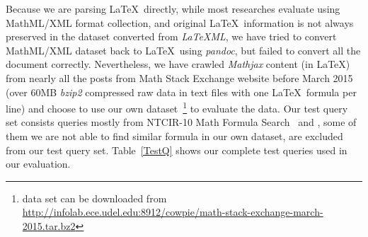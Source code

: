 Because we are parsing \LaTeX\ directly, while most researches evaluate using MathML/XML format collection, 
and original \LaTeX\ information is not always preserved in the dataset converted from \textit{LaTeXML}, 
we have tried to convert MathML/XML dataset back to \LaTeX\ using \textit{pandoc}, but failed to convert all the document correctly. 
Nevertheless, we have crawled \textit{Mathjax} content (in \LaTeX) from nearly all the posts from Math Stack Exchange website before March 2015 (over 60MB \textit{bzip2} compressed raw data in text files with one \LaTeX\ formula per line) and choose to use our own dataset~\footnote{data set can be downloaded from \url{http://infolab.ece.udel.edu:8912/cowpie/math-stack-exchange-march-2015.tar.bz2}} to evaluate the data.
Our test query set consists queries mostly from NTCIR-10 Math Formula Search~\cite{ntcirtopic} and \cite{symbolpairs15}, some of them we are not able to find similar formula in our own dataset, are excluded from our test query set.
Table~\ref{TestQ} shows our complete test queries used in our evaluation. 

